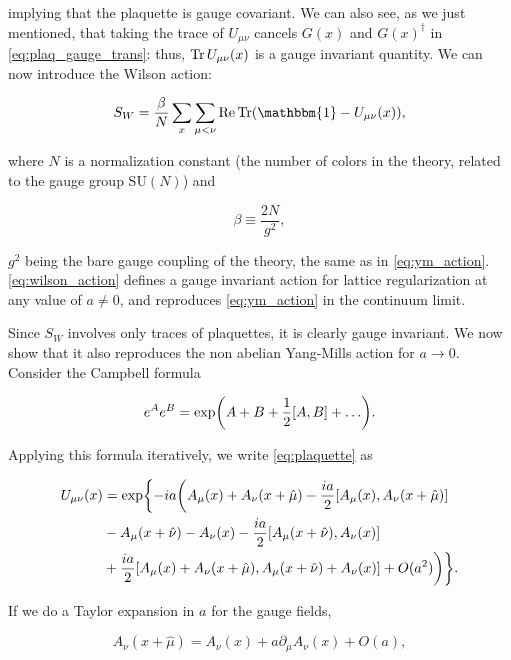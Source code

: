 \documentclass[reqno,12pt]{article}
\numberwithin{equation}{section}
\newcommand{\SU}{\mathrm{SU}}
\newcommand{\id}{\mathbbm{1}}
\begin{document}
implying that the plaquette is gauge covariant. We can also see, as we just mentioned, that taking the trace of $U_{\mu\nu}$
cancels $G(x)$ and $G(x)^\dagger$ in \eqref{eq:plaq_gauge_trans}: thus, $\Tr U_{\mu\nu}(x)$ is a gauge invariant quantity.
We can now introduce the Wilson action:

\begin{equation} \label{eq:wilson_action}
	S_W = \frac{\beta}{N} \sum_x \sum_{\mu<\nu} \Re \Tr(\id - U_{\mu\nu}(x)),
\end{equation}

where $N$ is a normalization constant (the number of colors in the theory, related to the gauge group $\SU(N)$) and

\begin{equation} \label{eq:beta}
	\beta \equiv \frac{2N}{g^2},
\end{equation}

$g^2$ being the bare gauge coupling of the theory, the same as in \eqref{eq:ym_action}. \eqref{eq:wilson_action} defines
a gauge invariant action for lattice regularization at any value of $a \ne 0$, and reproduces \eqref{eq:ym_action} in the 
continuum limit.

Since $S_W$ involves only traces of plaquettes, it is clearly gauge invariant. We now show that it also reproduces the
non abelian Yang-Mills action for $a \rightarrow 0$. Consider the Campbell formula

\begin{equation}
	e^A e^B = \exp(A + B + \frac{1}{2}\qty[A, B] + \dots).
\end{equation}

Applying this formula iteratively, we write \eqref{eq:plaquette} as 

\begin{equation} \label{eq:expandend_plaquette}
	\begin{aligned}
		U_{\mu\nu}(x) &= \exp \biggl\{ -ia\biggl( A_\mu(x) + A_\nu(x + \hat{\mu}) - \frac{ia}{2}\qty[A_\mu(x), A_\nu(x+\hat\mu)] \\
		&- A_\mu(x + \hat\nu) - A_\nu(x) - \frac{ia}{2}\qty[A_\mu(x + \hat\nu), A_\nu(x)] \\
		&+ \frac{ia}{2}\qty[A_\mu(x) + A_\nu(x+\hat\mu), A_\mu(x + \hat\nu) + A_\nu(x)] + O(a^2) \biggr) \biggr\}.
	\end{aligned}
\end{equation}

If we do a Taylor expansion in $a$ for the gauge fields,

\begin{equation}
	A_\nu(x + \hat\mu) = A_\nu(x) + a \partial_\mu A_\nu(x) + O(a),
\end{equation}
\end{document}
